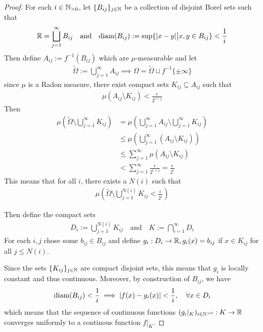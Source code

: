 \begin{proof}
  For each $i \in \mathbb{N}_{> 0}$, let $\{B_{ij}\}_{j \in \mathbb{N}}$ be a collection of disjoint Borel sets such that 
  \begin{align*}
    \mathbb{R} = \bigsqcup_{j = 1}^{\infty}B_{ij} \quad \text{and} \quad 
    \text{diam}(B_{ij}) := \sup \{\vert x - y\vert \big\vert x,y \in B_{ij}\} < \frac{1}{i}
  \end{align*}
  Then define $A_{ij} := f^{-1}(B_{ij})$ which are $\mu$-measurable and let
  \begin{align*}
    \tilde{\Omega} := \bigcup_{j=1}^{\infty}A_{ij} \implies \Omega = \tilde{\Omega} \sqcup f^{-1}\{\pm \infty\}
  \end{align*}
  since $\mu$ is a Radon measure, there exist compact sets $K_{ij} \subseteq A_{ij}$ such that
  \begin{align*}
    \mu(A_{ij} \setminus K_{ij}) < \frac{\epsilon}{2^{i+j}}
  \end{align*}
  Then 
  \begin{align*}
    \mu\left(
      \tilde{\Omega} \setminus \bigcup_{j=1}^{\infty}K_{ij}
    \right)
    &=
    \mu\left(
      \bigcup_{j=1}^{\infty}A_{ij} 
      \setminus
      \bigcup_{j=1}^{\infty}K_{ij}
    \right)
    \\
    &\leq \mu\left(
      \bigcup_{j=1}^{\infty}(A_{ij} \setminus K_{ij})
    \right)
    \\
    &\leq \sum_{j=1}^{\infty} \mu(A_{ij} \setminus K_{ij})\\
    &< \sum_{j=1}^{\infty} \frac{\epsilon}{2^{i+j}} = \frac{\epsilon}{2^{i}}
  \end{align*}
  This means that for all $i$, there exists a $N(i)$ such that
  \begin{align*}
    \mu\left(
      \tilde{\Omega} \setminus \bigcup_{j=1}^{N(i)} K_{ij}  < \frac{\epsilon}{2^{i}}
    \right)
  \end{align*}

  Then define the compact sets
  \begin{align*}
    D_i := \bigcup_{j=1}^{N(i)} K_{ij}
    \quad \text{and} \quad
    K := \bigcap_{i=1}^{\infty}D_i
  \end{align*}
  For each $i,j$ chose some $b_{ij} \in B_{ij}$ and define $g_i: D_i \to \mathbb{R}, g_i(x) = b_{ij}$ if $x \in K_{ij}$ for all $j \leq N(i)$.

  Since the sets $\{K_{ij}\}_{j \in \mathbb{N}}$ are compact disjoint sets, this means that $g_i$ is locally constant and thus continuous.
  Moreover, by construction of $B_{ij}$, we have
  \begin{align*}
    \text{diam}(B_{ij}) < \frac{1}{i} \implies \vert f(x) - g_i(x)\vert < \frac{1}{i}, \quad \forall x \in D_i
  \end{align*}
  which means that the sequence of continuous functions $(g_i|_K)_{i \in \mathbb{N}^{> 0}}:K \to \mathbb{R}$ converges uniformly to a continous function $f|_K$.


\end{proof}
